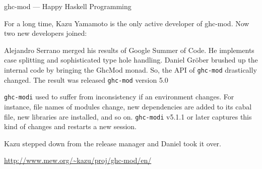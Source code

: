 \begin{hcarentry}[updated]{ghc-mod --- Happy Haskell Programming}
\makeheader

For a long time, Kazu Yamamoto is the only active developer of ghc-mod.
Now two new developers joined:

Alejandro Serrano merged his results of Google Summer of Code. He
implements case splitting and sophisticated type hole handling.
Daniel Gröber brushed up the internal code by bringing the GhcMod
monad. So, the API of \texttt{ghc-mod} drastically changed.
The result was released \texttt{ghc-mod} version 5.0

\texttt{ghc-modi} used to suffer from inconsistency if an environment
changes.  For instance, file names of modules change, new dependencies
are added to its cabal file, new libraries are installed, and so on.
\texttt{ghc-modi} v5.1.1 or later captures this kind of changes and
restarts a new session.

Kazu stepped down from the release manager and Daniel took it over.

\FurtherReading
  \url{http://www.mew.org/~kazu/proj/ghc-mod/en/}
\end{hcarentry}
